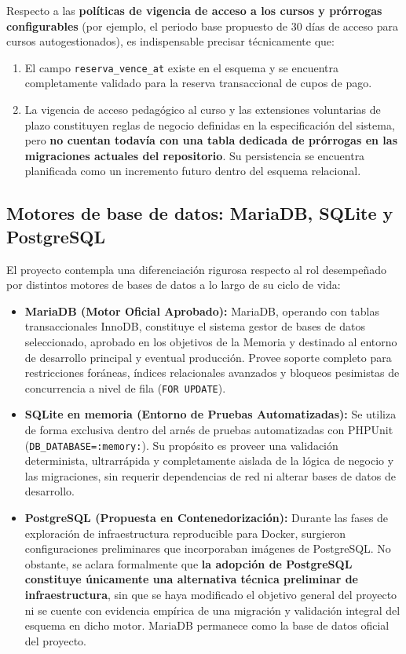 Respecto a las \textbf{políticas de vigencia de acceso a los cursos y prórrogas configurables} (por ejemplo, el periodo base propuesto de 30 días de acceso para cursos autogestionados), es indispensable precisar técnicamente que:
\begin{enumerate}
    \item El campo \texttt{reserva\_vence\_at} existe en el esquema y se encuentra completamente validado para la reserva transaccional de cupos de pago.
    \item La vigencia de acceso pedagógico al curso y las extensiones voluntarias de plazo constituyen reglas de negocio definidas en la especificación del sistema, pero \textbf{no cuentan todavía con una tabla dedicada de prórrogas en las migraciones actuales del repositorio}. Su persistencia se encuentra planificada como un incremento futuro dentro del esquema relacional.
\end{enumerate}

\subsection{Motores de base de datos: MariaDB, SQLite y PostgreSQL}
\label{sec:motores_bd}

El proyecto contempla una diferenciación rigurosa respecto al rol desempeñado por distintos motores de bases de datos a lo largo de su ciclo de vida:

\begin{itemize}
    \item \textbf{MariaDB (Motor Oficial Aprobado):} MariaDB, operando con tablas transaccionales InnoDB, constituye el sistema gestor de bases de datos seleccionado, aprobado en los objetivos de la Memoria y destinado al entorno de desarrollo principal y eventual producción. Provee soporte completo para restricciones foráneas, índices relacionales avanzados y bloqueos pesimistas de concurrencia a nivel de fila (\texttt{FOR UPDATE}).
    \item \textbf{SQLite en memoria (Entorno de Pruebas Automatizadas):} Se utiliza de forma exclusiva dentro del arnés de pruebas automatizadas con PHPUnit (\texttt{DB\_DATABASE=:memory:}). Su propósito es proveer una validación determinista, ultrarrápida y completamente aislada de la lógica de negocio y las migraciones, sin requerir dependencias de red ni alterar bases de datos de desarrollo.
    \item \textbf{PostgreSQL (Propuesta en Contenedorización):} Durante las fases de exploración de infraestructura reproducible para Docker, surgieron configuraciones preliminares que incorporaban imágenes de PostgreSQL. No obstante, se aclara formalmente que \textbf{la adopción de PostgreSQL constituye únicamente una alternativa técnica preliminar de infraestructura}, sin que se haya modificado el objetivo general del proyecto ni se cuente con evidencia empírica de una migración y validación integral del esquema en dicho motor. MariaDB permanece como la base de datos oficial del proyecto.
\end{itemize}


